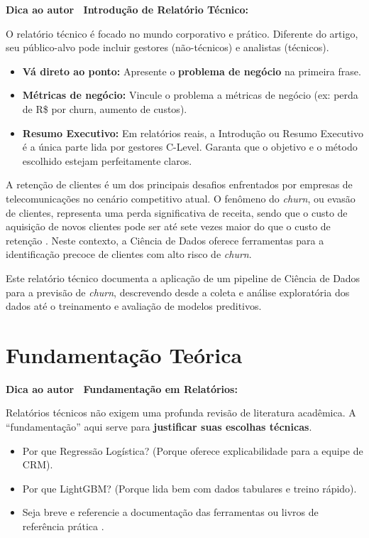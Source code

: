 \documentclass[
    article,
    12pt,
    oneside,
    a4paper,
    english,
    brazilian
    ]{abntex2}
\numberwithin{equation}{section}
\newenvironment{dica}{%
    \par\medskip
    \color{blue!60!black}\small\itshape
}{%
    \par\medskip
}
\begin{document}
\begin{dica}
\noindent\textbf{Dica ao autor \textemdash\ Introdução de Relatório Técnico:}

O relatório técnico é focado no mundo corporativo e prático. Diferente do artigo, seu público-alvo pode incluir gestores (não-técnicos) e analistas (técnicos).
\begin{itemize}
    \item \textbf{Vá direto ao ponto:} Apresente o \textbf{problema de negócio} na primeira frase.
    \item \textbf{Métricas de negócio:} Vincule o problema a métricas de negócio (ex: perda de R\$ por churn, aumento de custos).
    \item \textbf{Resumo Executivo:} Em relatórios reais, a Introdução ou Resumo Executivo é a única parte lida por gestores C-Level. Garanta que o objetivo e o método escolhido estejam perfeitamente claros.
\end{itemize}
\end{dica}

A retenção de clientes é um dos principais desafios enfrentados por empresas de telecomunicações no cenário competitivo atual. O fenômeno do \textit{churn}, ou evasão de clientes, representa uma perda significativa de receita, sendo que o custo de aquisição de novos clientes pode ser até sete vezes maior do que o custo de retenção \cite{provost2013}. Neste contexto, a Ciência de Dados oferece ferramentas para a identificação precoce de clientes com alto risco de \textit{churn}.

Este relatório técnico documenta a aplicação de um pipeline de Ciência de Dados para a previsão de \textit{churn}, descrevendo desde a coleta e análise exploratória dos dados até o treinamento e avaliação de modelos preditivos.

\section{Fundamentação Teórica}

\begin{dica}
\noindent\textbf{Dica ao autor \textemdash\ Fundamentação em Relatórios:}

Relatórios técnicos não exigem uma profunda revisão de literatura acadêmica. A ``fundamentação'' aqui serve para \textbf{justificar suas escolhas técnicas}.
\begin{itemize}
    \item Por que Regressão Logística? (Porque oferece explicabilidade para a equipe de CRM).
    \item Por que LightGBM? (Porque lida bem com dados tabulares e treino rápido).
    \item Seja breve e referencie a documentação das ferramentas ou livros de referência prática \cite{geron2022}.
\end{itemize}
\end{dica}
\end{document}
